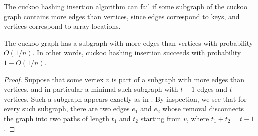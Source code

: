 \documentclass{patmorin}
\begin{document}
The cuckoo hashing insertion algorithm can fail if some subgraph of
the cuckoo graph contains more edges than vertices, since edges
correspond to keys, and vertices correspond to array locations.
\begin{lem}
  The cuckoo graph has a subgraph with more edges than vertices with
  probability $O(1/n)$. In other words, cuckoo hashing insertion
  succeeds with probability $1 - O(1/n)$.
\end{lem}
\begin{proof}
  Suppose that some vertex $v$ is part of a subgraph with more edges
  than vertices, and in particular a minimal such subgraph with $t +
  1$ edges and $t$ vertices. Such a subgraph appears exactly as in
  . By inspection, we see that for every such 
  subgraph, there are two edges
  $e_1$ and $e_2$ whose removal disconnects the graph into two paths
  of length $t_1$ and $t_2$ starting from $v$, where $t_1 + t_2 = t -
  1$.


\end{proof}
\end{document}
